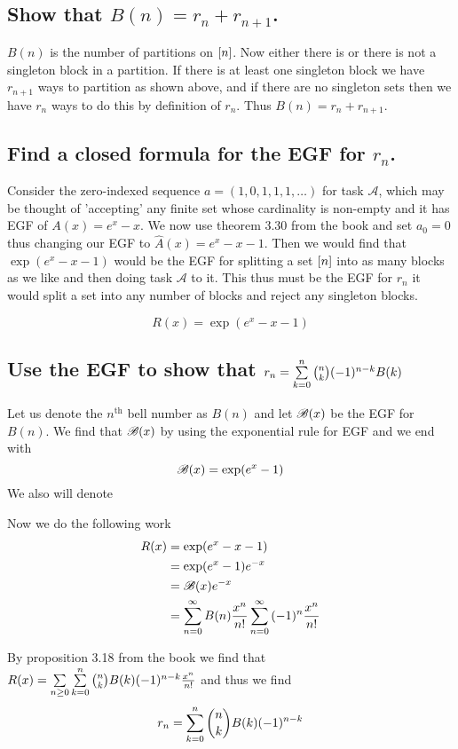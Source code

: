 \documentclass{article}
\theoremstyle{definition}
\begin{document}
\subsection{Show that $B(n) = r_n + r_{n+1}$.}
$B(n)$ is the number of partitions on $\left[ n \right]$. Now either there is or there is not a singleton block in a partition. If there is at least one singleton block we have $r_{n+1}$ ways to partition as shown above, and if there are no singleton sets then we have $r_n$ ways to do this by definition of $r_n$. Thus $B(n) = r_n + r_{n+1}$.

\subsection{Find a closed formula for the EGF for $r_n$.}
Consider the zero-indexed sequence $a = (1,0,1,1,1, \ldots)$ for task $\mathcal A$, which may be thought of 'accepting' any finite set whose cardinality is non-empty and it has EGF of $A(x) = e^x-x$. We now use theorem 3.30 from the book and set $a_0 = 0$ thus changing our EGF to $\hat A(x) = e^x-x-1$. Then we would find that $\exp(e^x-x-1)$ would be the EGF for splitting a set $\left[ n \right]$ into as many blocks as we like and then doing task $\mathcal A$ to it. This thus must be the EGF for $r_n$ it would split a set into any number of blocks and reject any singleton blocks.

\[R(x) = \exp\left(e^x-x-1\right)\]

\subsection{Use the EGF to show that $r_n = \sum\limits_{k=0}^{n}  {\binom nk (-1)^{n-k}B(k)} $}

Let us denote the $n^{\text{th}}$ bell number as $B(n)$ and let $\mathscr B(x)$ be the EGF for $B(n)$. We find that $\mathscr B(x)$ by using the exponential rule for EGF and we end with \[\mathscr B(x) = \exp(e^x-1)\] We also will denote

Now we do the following work
\begin{align*}
	R(x) &= \exp(e^x-x-1) \\
	&= \exp(e^x-1)e^{-x} \\
	&= \mathscr B(x)e^{-x} \\
	&= \sum\limits_{n=0}^{\infty}  { B(n)\frac{x^n}{n!}} \sum\limits_{n=0}^{\infty}  {(-1)^n\frac{x^n}{n!}} 
\end{align*}

By proposition 3.18 from the book we find that $R(x) = \sum\limits_{n\ge0}^{}  {\sum\limits_{k=0}^{n}  {\binom{n}{k}B(k)(-1)^{n-k}} \frac{x^n}{n!}} $ and thus we find \[r_n = \sum\limits_{k=0}^{n}  {\binom{n}{k}B(k)(-1)^{n-k}} \]
\end{document}
